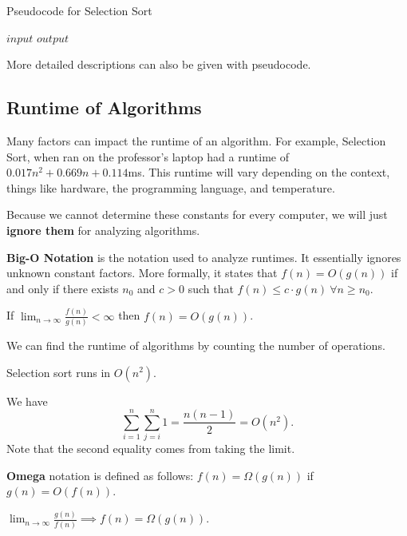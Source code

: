 \begin{algorithm}
	\algrenewcommand{}
	\algrenewcommand{}
	\caption{Pseudocode for Selection Sort}\label{alg:selection-sort}
	\begin{algorithmic}[1]
		\Require $input$
		\Ensure $output$
		\EndFor
	\end{algorithmic}
\end{algorithm}

More detailed descriptions can also be given with pseudocode.

\subsection{Runtime of Algorithms}

Many factors can impact the runtime of an algorithm. For example, Selection Sort, when ran on the professor's laptop had a runtime of \( 0.017 n^2 + 0.669 n + 0.114\)ms. This runtime will vary depending on the context, things like hardware, the programming language, and temperature.

Because we cannot determine these constants for every computer, we will just \textbf{ignore them} for analyzing algorithms.

\begin{definition}
	\textbf{Big-O Notation} is the notation used to analyze runtimes. It essentially ignores unknown constant factors. More formally, it states that \( f(n)=O(g(n)) \) if and only if there exists \( n_0 \) and \( c>0 \) such that \( f(n) \le c\cdot g(n) ~ \forall n \ge n_0\).
\end{definition}

\begin{lemma}
	If \( \lim_{n \to \infty} \frac{f(n)}{g(n)} < \infty \) then \( f(n) = O(g(n)) \).
\end{lemma}

We can find the runtime of algorithms by counting the number of operations.

\begin{eg}
	Selection sort runs in \( O(n^2) \).
\end{eg}
\begin{explanation}
	We have \[
		\sum_{i=1}^{n} \sum_{j=i}^{n} 1 =  \frac{n(n-1)}{2} = O(n^2)
	.\] 
	Note that the second equality comes from taking the limit.
\end{explanation}

\begin{definition}
	\textbf{Omega} notation is defined as follows: \( f(n) = \Omega(g(n)) \) if \( g(n) = O(f(n)) \).
\end{definition}

\begin{lemma}
	\( \lim_{n \to \infty} \frac{g(n)}{f(n)} \implies f(n) = \Omega(g(n)) \).
\end{lemma}
